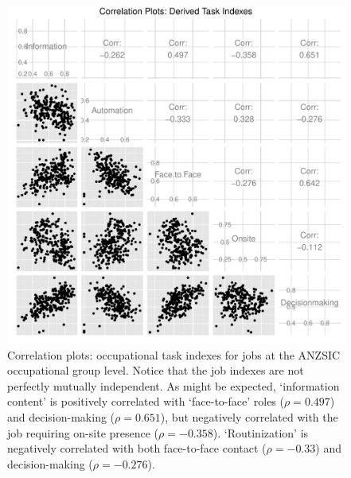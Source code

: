 \begin{figure}
  \centering
  \includegraphics[width=\textwidth]{../figure/correl.pdf}
  \caption{Correlation plots: occupational task indexes for jobs at the ANZSIC occupational group level. Notice that the job indexes are not perfectly mutually independent. As might be expected, `information content' is positively correlated with `face-to-face' roles ($\rho=0.497$) and decision-making ($\rho=0.651$), but negatively correlated with the job requiring on-site presence ($\rho=-0.358$). `Routinization' is negatively correlated with both face-to-face contact ($\rho=-0.33$) and decision-making ($\rho=-0.276$).}
  \label{fig:correl}
\end{figure}

